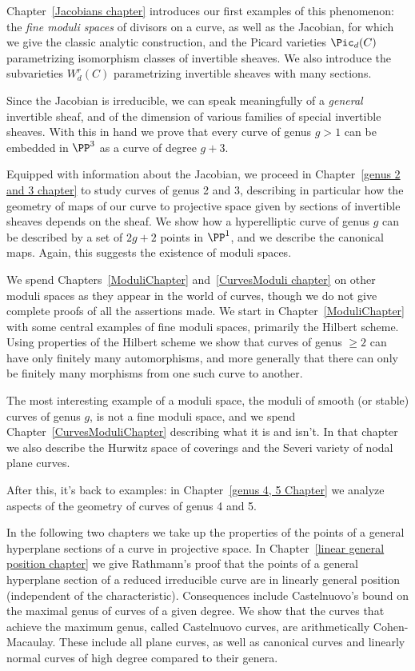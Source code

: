 Chapter~\ref{Jacobians chapter} introduces our first examples of this phenomenon: the \emph{fine moduli spaces} of divisors on a curve, as well as the Jacobian, for which we give the classic analytic construction, and the Picard varieties $\Pic_d(C)$ parametrizing isomorphism classes of invertible sheaves. We also introduce the subvarieties $W^{r}_{d}(C)$ parametrizing invertible sheaves with many sections. 

 Since the Jacobian is irreducible, we can speak meaningfully of a \emph{general} invertible sheaf, and of the dimension of various families of special invertible sheaves. With this in hand we prove
that every curve of genus $g>1$ can be embedded in $\PP^{3}$ as a curve of degree $g+3$.

Equipped with information about the Jacobian, we proceed in Chapter~\ref{genus 2 and 3 chapter} to study curves of genus 2 and 3, describing in particular how the geometry of maps of our curve to projective space given by sections of invertible sheaves depends on the sheaf. We show how a hyperelliptic curve of genus $g$
can be described by a set of $2g+2$ points in $\PP^{1}$, and we describe the canonical maps. Again, this
suggests the existence of moduli spaces.

We spend Chapters~\ref{ModuliChapter} and~\ref{CurvesModuli chapter} on other moduli spaces as they appear in the world of curves, though we do not give complete proofs of all the assertions made. We start in Chapter~\ref{ModuliChapter} with some central examples of fine moduli spaces, primarily
the Hilbert scheme. Using properties of the Hilbert scheme we show that curves of genus $\geq 2$
can have only finitely many automorphisms, and more generally that there can only be finitely
many morphisms from one such curve to another.

The most interesting example of a moduli space, the moduli of smooth (or stable) curves of genus $g$, is not a fine moduli space, and we spend Chapter~\ref{CurvesModuliChapter} describing what it is and isn't. In that chapter we also describe the Hurwitz space of coverings and the Severi variety of nodal plane curves.

After this, it's back to examples: in Chapter~\ref{genus 4, 5 Chapter} we analyze aspects of the geometry of curves of genus 4 and 5.  

In the following two chapters we take up 
the properties of the points of a general hyperplane sections of a curve in projective space. 
In Chapter~\ref{linear general position chapter} we give Rathmann's proof that
the points of a general hyperplane section of a reduced irreducible curve are in linearly general position (independent of the characteristic).
Consequences include Castelnuovo's bound  on the maximal genus of curves of a given degree.
We show that the curves that achieve the maximum genus, called Castelnuovo curves,
are arithmetically Cohen-Macaulay. These include all plane curves, as well as
canonical curves and linearly normal curves of high degree compared to their genera. 

